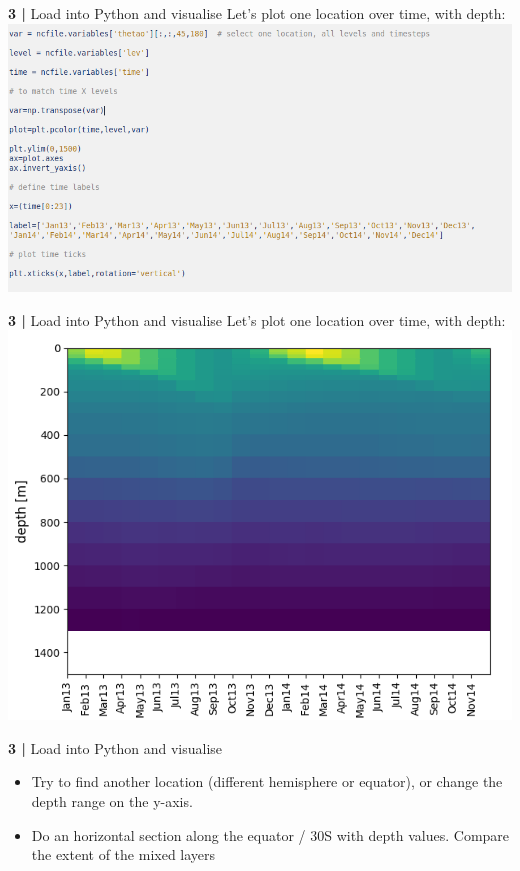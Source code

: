 \begin{frame}{\textbf{3 |} Load into Python and visualise} 
    Let's plot one location over time, with depth: \\
    \includegraphics[scale=0.35]{images/Script1_step13.png}
\end{frame}


\begin{frame}{\textbf{3 |} Load into Python and visualise} 
    Let's plot one location over time, with depth: \\
    \includegraphics[scale=0.35]{images/script1_fig10.png}
\end{frame}


\begin{frame}{\textbf{3 |} Load into Python and visualise} 
    \begin{beamerboxesrounded}[lower=gray,shadow=true]{
        \begin{itemize}
            \item Try to find another location (different hemisphere or equator), or change the depth range on the y-axis.
            \item Do an horizontal section along the equator / 30S with depth values. Compare the extent of the mixed layers
        \end{itemize}}
    \end{beamerboxesrounded}
\end{frame} 


